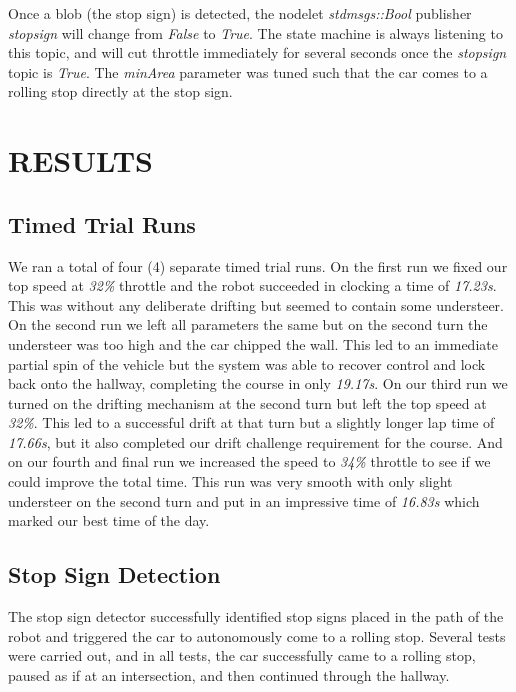 \documentclass[letterpaper, 10 pt, conference]{ieeeconf}  %
\begin{document}
Once a blob (the stop sign) is detected, the nodelet \textit{std\textunderscore{}msgs::Bool} publisher \textit{stopsign} will change from \textit{False} to \textit{True}. The state machine is always listening to this topic, and will cut throttle immediately for several seconds once the \textit{stopsign} topic is \textit{True}. The \textit{minArea} parameter was tuned such that the car comes to a rolling stop directly at the stop sign.

\section{RESULTS}

\subsection{Timed Trial Runs}
We ran a total of four (4) separate timed trial runs. On the first run we fixed our top speed at \textit{32\%} throttle and the robot succeeded in clocking a time of \textit{17.23s}. This was without any deliberate drifting but seemed to contain some understeer. On the second run we left all parameters the same but on the second turn the understeer was too high and the car chipped the wall. This led to an immediate partial spin of the vehicle but the system was able to recover control and lock back onto the hallway, completing the course in only \textit{19.17s}. On our third run we turned on the drifting mechanism at the second turn but left the top speed at \textit{32\%}. This led to a successful drift at that turn but a slightly longer lap time of \textit{17.66s}, but it also completed our drift challenge requirement for the course. And on our fourth and final run we increased the speed to \textit{34\%} throttle to see if we could improve the total time. This run was very smooth with only slight understeer on the second turn and put in an impressive time of \textit{16.83s} which marked our best time of the day.

\subsection{Stop Sign Detection}
The stop sign detector successfully identified stop signs placed in the path of the robot and triggered the car to autonomously come to a rolling stop. Several tests were carried out, and in all tests, the car successfully came to a rolling stop, paused as if at an intersection, and then continued through the hallway.
\end{document}
